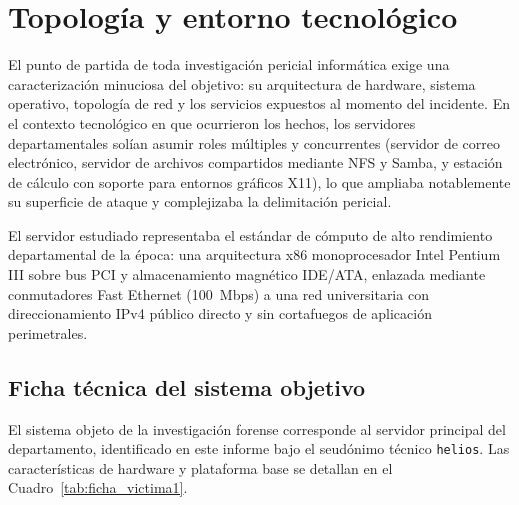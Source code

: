 \chapter{Topología y entorno tecnológico}

El punto de partida de toda investigación pericial informática exige una caracterización minuciosa del objetivo: su arquitectura de hardware, sistema operativo, topología de red y los servicios expuestos al momento del incidente. En el contexto tecnológico en que ocurrieron los hechos, los servidores departamentales solían asumir roles múltiples y concurrentes (servidor de correo electrónico, servidor de archivos compartidos mediante NFS y Samba, y estación de cálculo con soporte para entornos gráficos X11), lo que ampliaba notablemente su superficie de ataque y complejizaba la delimitación pericial.

\begin{notaforense}
El servidor estudiado representaba el estándar de cómputo de alto rendimiento departamental de la época: una arquitectura x86 monoprocesador Intel Pentium III sobre bus PCI y almacenamiento magnético IDE/ATA, enlazada mediante conmutadores Fast Ethernet (100~Mbps) a una red universitaria con direccionamiento IPv4 público directo y sin cortafuegos de aplicación perimetrales.
\end{notaforense}

\section{Ficha técnica del sistema objetivo}

El sistema objeto de la investigación forense corresponde al servidor principal del departamento, identificado en este informe bajo el seudónimo técnico \texttt{helios}. Las características de hardware y plataforma base se detallan en el Cuadro~\ref{tab:ficha_victima1}.


